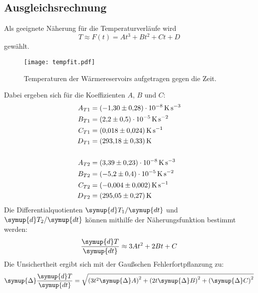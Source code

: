 \subsection{Ausgleichsrechnung}
Als geeignete Näherung für die Temperaturverläufe wird
\begin{equation}
    T \approx F(t) = At^3 + Bt^2 + Ct + D
\end{equation}
gewählt.
\begin{figure}[H]
  \centering
  \texttt{[image: tempfit.pdf]}
  \caption{Temperaturen der Wärmereservoirs aufgetragen gegen die Zeit.}
  \label{fig:tempfit}
\end{figure}
\noindent Dabei ergeben sich für die Koeffizienten $A$, $B$ und $C$:
\begin{align*}
    A_{T1} & = \SI[per-mode=reciprocal]{-1.3 \pm 0.28e-8}{\kelvin\per\second\cubed}    \\
    B_{T1} & = \SI[per-mode=reciprocal]{2.2 \pm 0.5e-5}{\kelvin\per\second\squared}           \\
    C_{T1} & = \SI[per-mode=reciprocal]{0.018 \pm 0.024}{\kelvin\per\second}                       \\
    D_{T1} & = \SI[per-mode=reciprocal]{293.18 \pm 0.33}{\kelvin}                       \\
\\
    A_{T2} & = \SI[per-mode=reciprocal]{3.39 \pm 0.23e-8}{\kelvin\per\second\cubed}    \\
    B_{T2} & = \SI[per-mode=reciprocal]{-5.2 \pm 0.4e-5}{\kelvin\per\second\squared}           \\
    C_{T2} & = \SI[per-mode=reciprocal]{-0.004 \pm 0.002}{\kelvin\per\second}                       \\
    D_{T2} & = \SI[per-mode=reciprocal]{295.05 \pm 0.27}{\kelvin}                       \\
\end{align*}
Die Differentialquotienten $\symup{d}T_1/\symup{dt}$ und $\symup{d}T_2/\symup{dt}$ können mithilfe der Näherungsfunktion
bestimmt werden:
\begin{equation}
    \frac{\symup{d}T}{\symup{dt}} \approx 3At^2 + 2Bt + C
\end{equation}
Die Unsichertheit ergibt sich mit der Gaußschen Fehlerfortpflanzung zu:
\begin{equation}
    \symup{\Delta}\frac{\symup{d}T}{\symup{dt}} = \sqrt{\left(3t^2\symup{\Delta}A\right)^2+\left(2t\symup{\Delta}B\right)^2+\left(\symup{\Delta}C\right)^2}
\end{equation}
